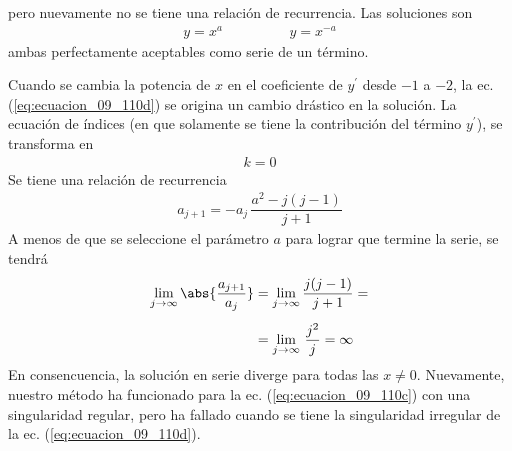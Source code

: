pero nuevamente no se tiene una relación de recurrencia. Las soluciones son
\begin{align*}
y = x^{a} \hspace{2cm} y = x^{-a}
\end{align*}
ambas perfectamente aceptables como serie de un término.
\par
Cuando se cambia la potencia de $x$ en el coeficiente de $y^{\prime}$ desde $-1$ a $-2$, la ec. (\ref{eq:ecuacion_09_110d}) se origina un cambio drástico en la solución. La ecuación de índices (en que solamente se tiene la contribución del término $y^{\prime}$), se transforma en
\begin{align*}
k = 0
\end{align*}
Se tiene una relación de recurrencia
\begin{align*}
a_{j+1} = - a_{j} \, \dfrac{a^{2} - j (j - 1)}{j + 1}
\end{align*}
A menos de que se seleccione el parámetro $a$ para lograr que termine la serie, se tendrá
\begin{align*}
\lim_{j \to \infty} \abs{ \dfrac{a_{j+1}}{a_{j}}} &= \lim_{j \to \infty} \dfrac{j (j - 1)}{j + 1} = \\[0.5em]
&= \lim_{j \to \infty} \, \dfrac{j^{2}}{j} = \infty
\end{align*}
En consencuencia, la solución en serie diverge para todas las $x \neq 0$. Nuevamente, nuestro método ha funcionado para la ec. (\ref{eq:ecuacion_09_110c}) con una singularidad regular, pero ha fallado cuando se tiene la singularidad irregular de la ec. (\ref{eq:ecuacion_09_110d}).
